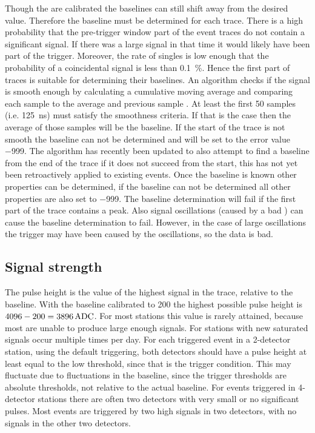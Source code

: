 Though the \adcs are calibrated the baselines can still shift away from the desired value. Therefore the baseline must be determined for each trace. There is a high probability that the pre-trigger window part of the event traces do not contain a significant signal. If there was a large signal in that time it would likely have been part of the trigger. Moreover, the rate of singles is low enough that the probability of a coincidental signal is less than \SI{0.1}{\percent}. Hence the first part of traces is suitable for determining their baselines. An algorithm checks if the signal is smooth enough by calculating a cumulative moving average and comparing each sample to the average and previous sample \cite{oostenbrugge2014daq}. At least the first 50 samples (i.e. \SI{125}{\ns}) must satisfy the smoothness criteria. If that is the case then the average of those samples will be the baseline. If the start of the trace is not smooth the baseline can not be determined and will be set to the error value \num{-999}. The algorithm has recently been updated to also attempt to find a baseline from the end of the trace if it does not succeed from the start, this has not yet been retroactively applied to existing events. Once the baseline is known other properties can be determined, if the baseline can not be determined all other properties are also set to \num{-999}. The baseline determination will fail if the first part of the trace contains a peak. Also signal oscillations (caused by a bad \pmt) can cause the baseline determination to fail. However, in the case of large oscillations the trigger may have been caused by the oscillations, so the data is bad.


\subsection{Signal strength}

The pulse height is the value of the highest signal in the trace, relative to the baseline. With the baseline calibrated to \SI{200}{\adc} the highest possible pulse height is $4096 - 200 = \SI{3896}{\adc}$. For most stations this value is rarely attained, because most \pmts are unable to produce large enough signals. For stations with new \pmts saturated signals occur multiple times per day. For each triggered event in a 2-detector station, using the default triggering, both detectors should have a pulse height at least equal to the low threshold, since that is the trigger condition. This may fluctuate due to fluctuations in the baseline, since the trigger thresholds are absolute thresholds, not relative to the actual baseline. For events triggered in 4-detector stations there are often two detectors with very small or no significant pulses. Most events are triggered by two high signals in two detectors, with no signals in the other two detectors.

